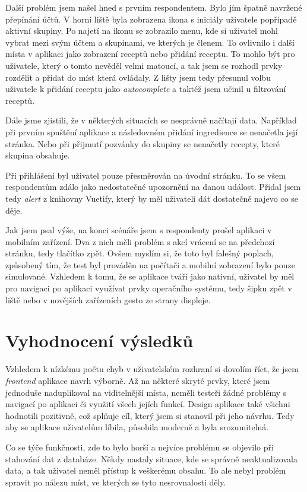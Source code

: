 Další problém jsem našel hned s prvním respondentem. Bylo jím špatně navržené přepínání účtů. V horní liště byla zobrazena ikona s iniciály uživatele
popřípadě aktivní skupiny. Po najetí na ikonu se zobrazilo menu, kde si uživatel mohl vybrat mezi svým účtem a skupinami, ve kterých je členem. To
ovlivnilo i další místa v aplikaci jako zobrazení receptů nebo přidání receptu. To mohlo být pro uživatele, který o tomto nevěděl velmi matoucí, a
tak jsem se rozhodl prvky rozdělit a přidat do míst která ovládaly. Z lišty jsem tedy přesunul volbu uživatele k přidání receptu jako \emph{autocomplete}
a taktéž jsem učinil u filtrování receptů.

Dále jsme zjistili, že v některých situacích se nesprávně načítají data. Například při prvním spuštění aplikace a následovném přidání ingredience
se nenačetla její stránka. Nebo při přijmutí pozvánky do skupiny se nenačetly recepty, které skupina obsahuje.

Při přihlášení byl uživatel pouze přesměrován na úvodní stránku. To se všem respondentům zdálo jako nedostatečné upozornění na danou událost.
Přidal jsem tedy \emph{alert} z knihovny Vuetify, který by měl uživateli dát dostatečně najevo co se děje.

Jak jsem psal výše, na konci scénáře jsem s respondenty prošel aplikaci v mobilním zařízení. Dva z nich měli problém s akcí vrácení se na předchozí stránku,
tedy tlačítko zpět. Ovšem myslím si, že toto byl falešný poplach, způsobený tím, že test byl prováděn na počítači a mobilní zobrazení bylo pouze simulované.
Vzhledem k tomu, že se aplikace tváří jako nativní, uživatel by měl pro navigaci po aplikaci využívat prvky operačního systému, tedy šipku zpět v liště nebo
v novějších zařízeních gesto ze strany displeje.

\section{Vyhodnocení výsledků}

Vzhledem k nízkému počtu chyb v uživatelském rozhraní si dovolím říct, že jsem \emph{frontend} aplikace navrh výborně. Až na některé
skryté prvky, které jsem jednoduše naduplikoval na viditelnější místa, neměli testeři žádné problémy s navigací po aplikaci či využití
všech jejích funkcí. Design aplikace také všichni hodnotili pozitivně, což splňuje cíl, který jsem si stanovil při jeho návrhu. Tedy aby
se aplikace uživatelům líbila, působila moderně a byla srozumitelná.

Co se týče funkčnosti, zde to bylo horší a nejvíce problému se objevilo při stahování dat z databáze. Někdy nastaly situace, kde se správně
neaktualizovala data, a tak uživatel neměl přístup k veškerému obsahu. To ale nebyl problém spravit po nálezu míst, ve kterých se tyto nesrovnalosti
děly.

